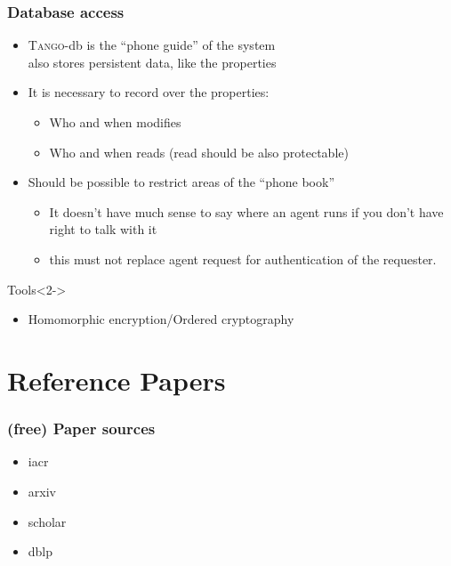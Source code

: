 \documentclass{beamer}
\newcommand{\tango}{\textsc{Tango}}
\begin{document}
\begin{frame}
\frametitle{Database access}
    \begin{itemize}
        \item \tango-db is the ``phone guide'' of the system\\also stores persistent data, like the properties
        \item It is necessary to record over the properties:
        \begin{itemize}
            \item Who and when modifies
            \item Who and when reads (read should be also protectable)
        \end{itemize}
        \item Should be possible to restrict areas of the ``phone book''
        \begin{itemize}
            \item It doesn't have much sense to say where an agent runs if you don't have right to talk with it
            \item this must not replace agent request for authentication of the requester.
        \end{itemize}
    \end{itemize}
    \begin{alertblock}{Tools}<2->
        \begin{itemize}
            \item Homomorphic encryption/Ordered cryptography
        \end{itemize}
    \end{alertblock}
\end{frame}

\section{Reference Papers}

\begin{frame}
\frametitle{(free) Paper sources}
\begin{itemize}
 \item iacr
 \item arxiv
 \item scholar
 \item dblp
\end{itemize} 
\end{frame}
\end{document}
